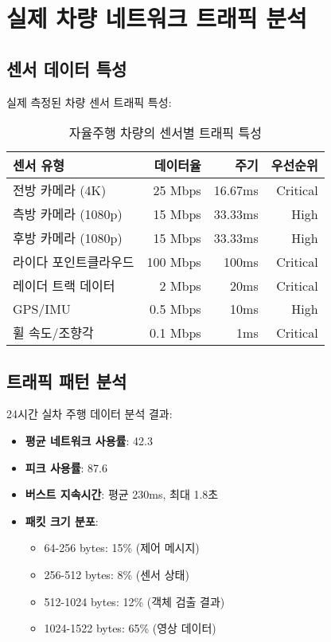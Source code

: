 \documentclass[twocolumn,10pt]{article}
\begin{document}
\section{실제 차량 네트워크 트래픽 분석}
\label{sec:traffic_analysis}

\subsection{센서 데이터 특성}

실제 측정된 차량 센서 트래픽 특성:

\begin{table}[h]
\centering
\caption{자율주행 차량의 센서별 트래픽 특성}
\label{tab:sensor_traffic}
\begin{tabular}{lrrr}
\toprule
\textbf{센서 유형} & \textbf{데이터율} & \textbf{주기} & \textbf{우선순위} \\
\midrule
전방 카메라 (4K) & 25 Mbps & 16.67ms & Critical \\
측방 카메라 (1080p) & 15 Mbps & 33.33ms & High \\
후방 카메라 (1080p) & 15 Mbps & 33.33ms & High \\
라이다 포인트클라우드 & 100 Mbps & 100ms & Critical \\
레이더 트랙 데이터 & 2 Mbps & 20ms & Critical \\
GPS/IMU & 0.5 Mbps & 10ms & High \\
휠 속도/조향각 & 0.1 Mbps & 1ms & Critical \\
\bottomrule
\end{tabular}
\end{table}

\subsection{트래픽 패턴 분석}

24시간 실차 주행 데이터 분석 결과:

\begin{itemize}
    \item \textbf{평균 네트워크 사용률}: 42.3%
    \item \textbf{피크 사용률}: 87.6%
    \item \textbf{버스트 지속시간}: 평균 230ms, 최대 1.8초
    \item \textbf{패킷 크기 분포}: 
        \begin{itemize}
            \item 64-256 bytes: 15\% (제어 메시지)
            \item 256-512 bytes: 8\% (센서 상태)
            \item 512-1024 bytes: 12\% (객체 검출 결과)
            \item 1024-1522 bytes: 65\% (영상 데이터)
        \end{itemize}
\end{itemize}
\end{document}
